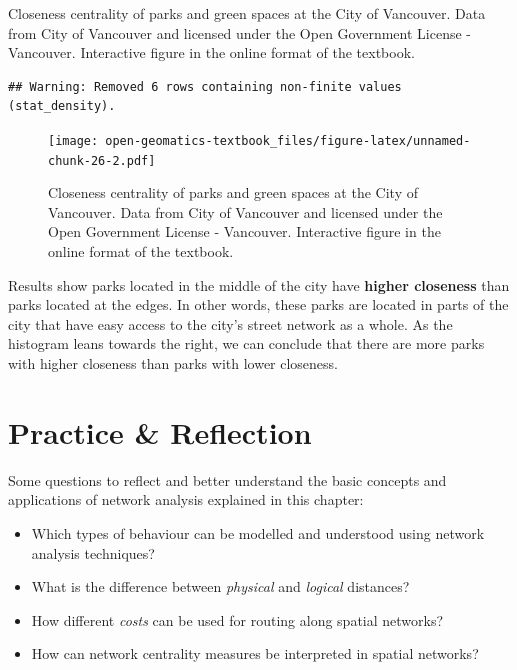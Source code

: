 \documentclass[
]{book}
\providecommand{\tightlist}{%
  \setlength{\itemsep}{0pt}\setlength{\parskip}{0pt}}
\begin{document}
\label{fig:unnamed-chunk-26}Closeness centrality of parks and green spaces at the City of Vancouver. Data from City of Vancouver and licensed under the Open Government License - Vancouver. Interactive figure in the online format of the textbook.

\begin{verbatim}
## Warning: Removed 6 rows containing non-finite values (stat_density).
\end{verbatim}

\begin{figure}
\centering
\texttt{[image: open-geomatics-textbook\_files/figure-latex/unnamed-chunk-26-2.pdf]}
\caption{\label{fig:unnamed-chunk-26}Closeness centrality of parks and green spaces at the City of Vancouver. Data from City of Vancouver and licensed under the Open Government License - Vancouver. Interactive figure in the online format of the textbook.}
\end{figure}

Results show parks located in the middle of the city have \textbf{higher closeness} than parks located at the edges. In other words, these parks are located in parts of the city that have easy access to the city's street network as a whole. As the histogram leans towards the right, we can conclude that there are more parks with higher closeness than parks with lower closeness.

\hypertarget{practice-reflection}{%
\section*{Practice \& Reflection}\label{practice-reflection}}

Some questions to reflect and better understand the basic concepts and applications of network analysis explained in this chapter:

\begin{itemize}
\tightlist
\item
  Which types of behaviour can be modelled and understood using network analysis techniques?
\item
  What is the difference between \emph{physical} and \emph{logical} distances?
\item
  How different \emph{costs} can be used for routing along spatial networks?
\item
  How can network centrality measures be interpreted in spatial networks?
\end{itemize}
\end{document}
